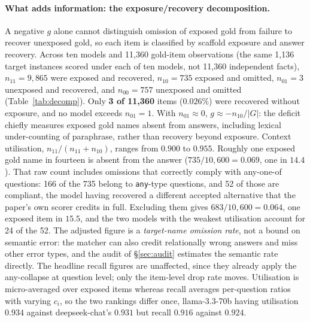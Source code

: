 \documentclass[10pt,twocolumn]{article}
\begin{document}
\paragraph{What adds information: the exposure/recovery decomposition.} A negative $g$ alone cannot distinguish omission of exposed gold from failure to recover unexposed gold, so each item is classified by scaffold exposure and answer recovery. Across ten models and 11{,}360 gold-item observations (the same 1{,}136 target instances scored under each of ten models, not 11{,}360 independent facts), $n_{11}=9{,}865$ were exposed and recovered, $n_{10}=735$ exposed and omitted, $n_{01}=3$ unexposed and recovered, and $n_{00}=757$ unexposed and omitted (Table~\ref{tab:decomp}). Only \textbf{3 of 11{,}360} items ($0.026\%$) were recovered without exposure, and no model exceeds $n_{01}=1$. With $n_{01}\approx0$, $g\approx-n_{10}/|G|$: the deficit chiefly measures exposed gold names absent from answers, including lexical under-counting of paraphrase, rather than recovery beyond exposure. Context utilisation, $n_{11}/(n_{11}+n_{10})$, ranges from $0.900$ to $0.955$. Roughly one exposed gold name in fourteen is absent from the answer ($735/10{,}600=0.069$, one in $14.4$). That raw count includes omissions that correctly comply with any-one-of questions: 166 of the 735 belong to \texttt{any}-type questions, and 52 of those are compliant, the model having recovered a different accepted alternative that the paper's own scorer credits in full. Excluding them gives $683/10{,}600=0.064$, one exposed item in $15.5$, and the two models with the weakest utilisation account for 24 of the 52. The adjusted figure is a \emph{target-name omission rate}, not a bound on semantic error: the matcher can also credit relationally wrong answers and miss other error types, and the audit of \S\ref{sec:audit} estimates the semantic rate directly. The headline recall figures are unaffected, since they already apply the any-collapse at question level; only the item-level drop rate moves. Utilisation is micro-averaged over exposed items whereas recall averages per-question ratios with varying $c_i$, so the two rankings differ once, llama-3.3-70b having utilisation $0.934$ against deepseek-chat's $0.931$ but recall $0.916$ against $0.924$.
\end{document}
